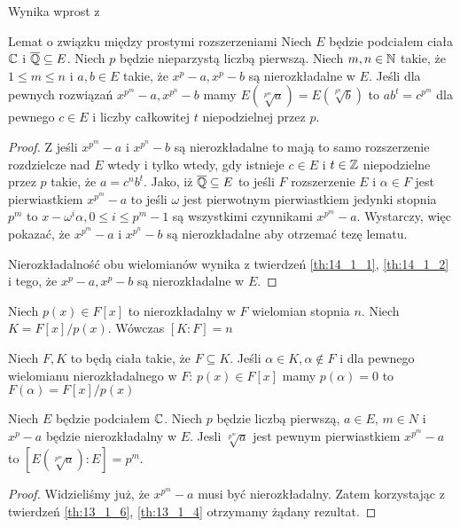   Wynika wprost z \cite[Twierdzenie 14.1.2]{rom06}

\begin{lemma}{Lemat o związku między prostymi rozszerzeniami}
  Niech $E$ będzie podciałem ciała $\mathbb{C}$ i $\overline{\mathbb{Q}} \subseteq E$.
  Niech $p$ będzie nieparzystą liczbą pierwszą.
  Niech $m, n \in \mathbb{N}$ takie, że $1 \leq m \leq n$ i $a, b \in E$ takie, że $x^p
  - a, x^p - b$ są nierozkładalne w $E$.
  Jeśli dla pewnych rozwiązań $x^{p^m} - a, x^{p^n} -b$ mamy
  $E\left(\sqrt[p^m]{a}\right) = E\left(\sqrt[p^n]{b}\right)$ to $ab^t =
  c^{p^m}$ dla pewnego $c \in E$ i liczby całkowitej $t$ niepodzielnej przez
  $p$.
  \label{lem:associated_extensions}
\end{lemma}
\begin{proof}
  Z \cite[Twierdzenie 14.2.8]{rom06} jeśli $x^{p^m} - a$ i $x^{p^n} - b$ są
  nierozkładalne to mają to samo rozszerzenie rozdzielcze nad $E$ wtedy i tylko
  wtedy, gdy istnieje $c \in E$ i $t \in \mathbb{Z}$ niepodzielne przez $p$ takie, że
  $a = c^nb^t$.
  Jako, iż $\overline{\mathbb{Q}} \subseteq E$ to jeśli $F$ rozszerzenie $E$ i $\alpha
  \in F$  jest pierwiastkiem $x^{p^m} -a$ to jeśli $\omega$ jest pierwotnym
  pierwiastkiem jedynki stopnia $p^m$ to $x - \omega^i \alpha, 0 \leq i \leq p^m
  - 1$ są wszystkimi czynnikami $x^{p^m} - a$.
  Wystarczy, więc pokazać, że $x^{p^m} - a$ i $x^{p^n} - b$ są nierozkładalne
  aby otrzemać tezę lematu.

  Nierozkładalność obu wielomianów wynika z twierdzeń \ref{th:14_1_1},
  \ref{th:14_1_2} i tego, że $x^p -a, x^p - b$ są nierozkładalne w $E$.
\end{proof}

\begin{theorem}
  Niech $p(x) \in F[x]$ to nierozkładalny w $F$ wielomian stopnia $n$.
  Niech $K = F[x]/p(x)$. Wówczas $[K:F] = n$
  \label{th:13_1_6}
\end{theorem}

  \cite[Twierdzenie 13.1.6]{dum04}

\begin{theorem}
  Niech $F, K$ to będą ciała takie, że $F \subseteq K$.
  Jeśli $\alpha \in K, \alpha \not \in F$ i dla pewnego wielomianu
  nierozkładalnego w $F$: $p(x) \in F[x]$ mamy $p(\alpha) = 0$ to
  $F(\alpha) = F[x]/p(x)$
  \label{th:13_1_4}
\end{theorem}

  \cite[Twierdzenie 13.1.4]{dum04}

\begin{lemma}
  Niech $E$ będzie podciałem $\mathbb{C}$. Niech $p$ będzie liczbą pierwszą, $a \in E$,
  $m \in N$ i $x^p - a$ będzie nierozkładalny w $E$.
  Jesli $\sqrt[p^m]{a}$ jest pewnym pierwiastkiem $x^{p^m} - a$ to
  $\left[E \left(\sqrt[p^m]{a} \right) : E \right] = p^m$.
  \label{lem:root_extension}
\end{lemma}
\begin{proof}
  Widzieliśmy już, że $x^{p^m} - a$ musi być nierozkładalny. Zatem korzystając z
  twierdzeń \ref{th:13_1_6}, \ref{th:13_1_4} otrzymamy żądany rezultat.
\end{proof}
